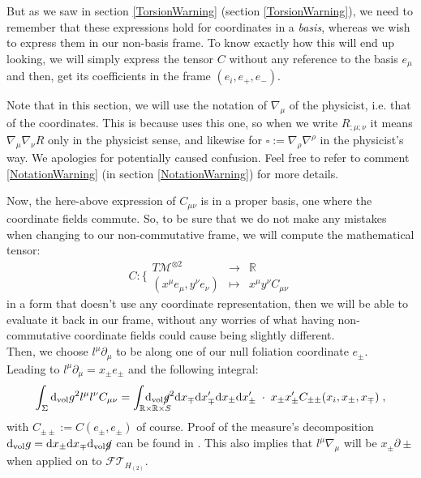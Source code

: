 \documentclass[a4paper,11pt]{article}
\numberwithin{equation}{section}
\theoremstyle{definition}
\renewcommand{\d}{{\mathrm{d}}}
\begin{document}
But as we saw in section \ref{TorsionWarning} (section \ref{TorsionWarning}), we need to remember that these expressions hold for coordinates in a \emph{basis}, whereas we wish to express them in our non-basis frame. To know exactly how this will end up looking, we will simply express the tensor $C$ without any reference to the basis $e_\mu$ and then, get its coefficients in the frame $(e_i,e_+,e_-)$.

Note that in this section, we will use the notation of $\nabla_\mu$ of the physicist, i.e. that of the coordinates. This is because \cite{QFTCurv} uses this one, so when we write $R_{;\mu;\nu}$ it means $\nabla_\mu \nabla_\nu R$ only in the physicist sense, and likewise for $\square:=\nabla_\rho \nabla^\rho$ in the physicist's way. We apologies for potentially caused confusion. Feel free to refer to comment \ref{NotationWarning} (in section \ref{NotationWarning}) for more details.

Now, the here-above expression of $C_{\mu\nu}$ is in a proper basis, one where the coordinate fields commute. So, to be sure that we do not make any mistakes when changing to our non-commutative frame, we will compute the mathematical tensor:
\begin{equation}
C : \Bigg\{\begin{matrix}
    T\mathcal{M}^{\otimes2} & \to & \mathbb{R}\\
    (x^\mu e_\mu, y^\nu e_\nu) & \mapsto & x^\mu y^\nu C_{\mu\nu}
\end{matrix}
\end{equation}
in a form that doesn't use any coordinate representation, then we will be able to evaluate it back in our frame, without any worries of what having non-commutative coordinate fields could cause being slightly different.\\
Then, we choose $l^\mu \partial_\mu$ to be along one of our null foliation coordinate $e_\pm$. \\
Leading to $l^\mu \partial_\mu = x_\pm e_\pm$ and the following integral:
\begin{equation}
    \int_\Sigma \d_\mathrm{vol}g^2 l^\mu l^\nu C_{\mu\nu} = \int_{\mathbb{R}\times \mathbb{R}\times S} \!\!\!\!\!\!\!\!\!\!\!\!\!\!\! \d_\mathrm{vol} \cancel{g}^2 \d x_\mp \d x_\mp' \d x_\pm \d x_\pm ' \;\cdot \; x_\pm x_\pm ' C_{\pm\pm}(x_i,x_\pm, x_\mp)\; ,
\end{equation}
with $C_{\pm\pm}:= C(e_\pm,e_\pm)$ of course. Proof of the measure's decomposition $\d_\mathrm{vol}g = \d x_\pm \d x_\mp \d_\mathrm{vol} \cancel{g}$ can be found in \cite{Art}. This also implies that $l^\mu \nabla_\mu$ will be $x_\pm \partial\pm$ when applied on to $\mathcal{FT}_{H_{(2)}}$.
\end{document}
